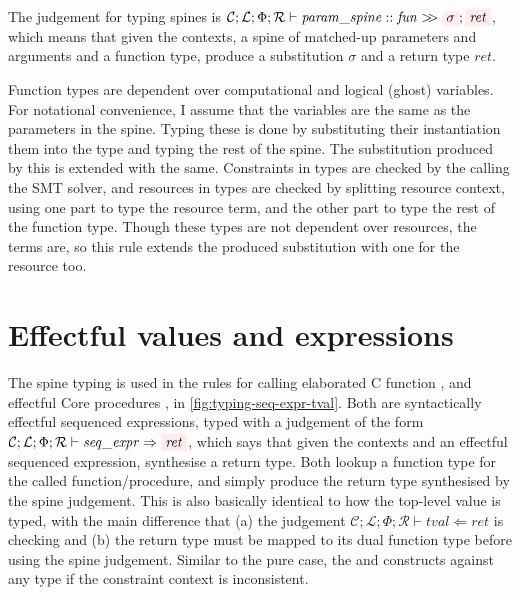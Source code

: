 The judgement for typing spines is $\mathcal{C}; \mathcal{L}; \Phi ;
\mathcal{R} \vdash \mathit{param\_spine} \mathrel{{:}{:}} \mathit{fun} >\!\!>
\outpol{\sigma}; \outpol{ret}$, which means that given the contexts, a spine of
matched-up parameters and arguments and a function type, produce a substitution
$\sigma$ and a return type $\mathit{ret}$.

Function types are dependent over computational and logical (ghost) variables.
For notational convenience, I assume that the variables are the same as the
parameters in the spine. Typing these is done by substituting their
instantiation them into the type and typing
the rest of the spine. The substitution produced by this is extended with the
same.\label{sn:tail-rec-sub} Constraints in types are
checked by the calling the SMT solver, and resources in types are
checked by splitting resource context, using one part to type the resource
term, and the other part to type the rest of the function type. Though these
types are not dependent over resources, the terms are, so this rule extends the
produced substitution with one for the resource too.

\section{Effectful values and expressions}

The spine typing is used in the rules for calling elaborated C function
, and effectful Core procedures %
, in \cref{fig:typing-seq-expr-tval}. Both are %
syntactically effectful sequenced expressions, typed with a judgement of the
form $\mathcal{C}; \mathcal{L}; \Phi; \mathcal{R} \vdash \mathit{seq\_expr}
\Rightarrow \outpol{ret}$, which says that given the contexts and an effectful
sequenced expression, synthesise a return type. Both lookup a function type for
the called function/procedure, and simply produce the return type synthesised by the spine
judgement. This is also basically identical to how the top-level value
 is typed, with the main difference that (a) the judgement
$\mathcal{C}; \mathcal{L}; \Phi; \mathcal{R} \vdash \mathit{tval} \Leftarrow
\mathit{ret}$ is checking and (b) the return type must be mapped to its dual
function type before using the spine judgement. Similar to the pure case, the
 and  constructs %
against any type if the constraint context is inconsistent.

